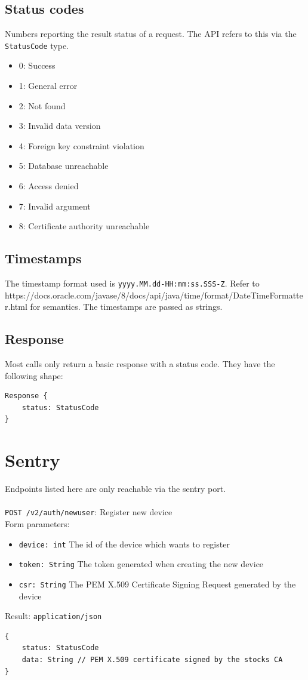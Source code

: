 \documentclass[12pt]{report}
\begin{document}
\subsection{Status codes}\label{status-codes}

Numbers reporting the result status of a request. The API refers to this
via the \texttt{StatusCode} type.

\begin{itemize}
\item 0: Success
\item 1: General error
\item 2: Not found
\item 3: Invalid data version
\item 4: Foreign key constraint violation
\item 5: Database unreachable
\item 6: Access denied
\item 7: Invalid argument
\item 8: Certificate authority unreachable
\end{itemize}

\subsection{Timestamps}

The timestamp format used is \texttt{yyyy.MM.dd-HH:mm:ss.SSS-Z}. Refer to\\
https://docs.oracle.com/javase/8/docs/api/java/time/format/DateTimeFormatter.html
for semantics. The timestamps are passed as strings.

\subsection{Response}
Most calls only return a basic response with a status code. They have the
following shape:
\begin{lstlisting}
Response {
    status: StatusCode
}
\end{lstlisting}

\section{Sentry}

Endpoints listed here are only reachable via the sentry port. \\\\
\texttt{POST /v2/auth/newuser}: Register new device\\
Form parameters:
\begin{itemize}
\item \texttt{device: int} The id of the device which wants to register
\item \texttt{token: String} The token generated when creating the new device
\item \texttt{csr: String} The PEM X.509 Certificate Signing Request generated by the device
\end{itemize}
Result: \texttt{application/json}
\begin{lstlisting}
{
    status: StatusCode
    data: String // PEM X.509 certificate signed by the stocks CA
}
\end{lstlisting}
\end{document}
